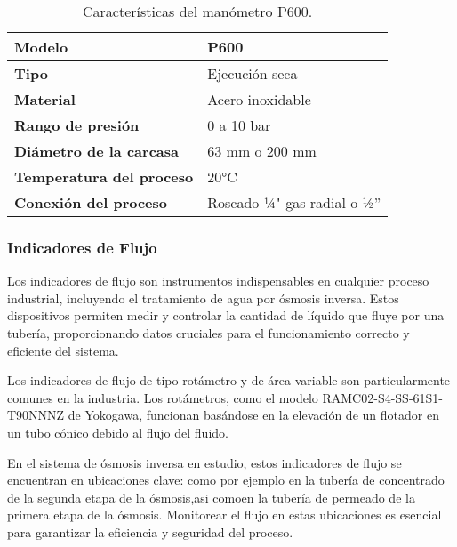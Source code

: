 

\begin{table}[H]
    \centering
    \caption{Características del manómetro P600.}
    \label{table:manometro}
    \begin{tabular}{| L{6cm} | L{6cm} |}

        \hline
        \textbf{Modelo}                  & P600                        \\
        \hline
        \textbf{Tipo}                    & Ejecución seca              \\
        \hline
        \textbf{Material}                & Acero inoxidable            \\
        \hline
        \textbf{Rango de presión}        & 0 a 10 bar                  \\
        \hline
        \textbf{Diámetro de la carcasa}  & 63 mm o 200 mm              \\
        \hline
        \textbf{Temperatura del proceso} & 20°C                        \\
        \hline
        \textbf{Conexión del proceso}    & Roscado ¼" gas radial o ½'' \\
        \hline
    \end{tabular}
\end{table}


\subsubsection{Indicadores de Flujo} \label{sec:indicador_flujo}

Los indicadores de flujo son instrumentos indispensables en cualquier proceso industrial,
incluyendo el tratamiento de agua por ósmosis inversa. Estos dispositivos permiten medir
y controlar la cantidad de líquido que fluye por una tubería, proporcionando datos cruciales
para el funcionamiento correcto y eficiente del sistema.

Los indicadores de flujo de tipo rotámetro y de área variable son particularmente comunes
en la industria. Los rotámetros, como el modelo RAMC02-S4-SS-61S1-T90NNNZ de Yokogawa,
funcionan basándose en la elevación de un flotador en un tubo cónico debido al flujo del
fluido.

En el sistema de ósmosis inversa en estudio, estos indicadores de flujo se encuentran en
ubicaciones clave: como por ejemplo en la tubería de concentrado
de la segunda etapa de la ósmosis,asi comoen la tubería de permeado de la primera etapa de la ósmosis. Monitorear
el flujo en estas ubicaciones es esencial para garantizar la eficiencia y seguridad del
proceso.

